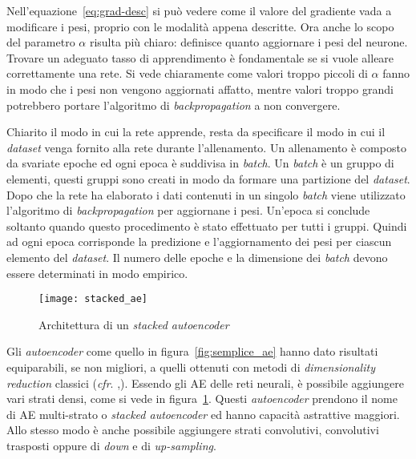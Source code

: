 Nell'equazione~\ref{eq:grad-desc} si può vedere come il valore del gradiente vada a modificare i pesi, proprio con le modalità appena descritte.
Ora anche lo scopo del parametro $\alpha$ risulta più chiaro: definisce quanto aggiornare i pesi del neurone.
Trovare un adeguato tasso di apprendimento è fondamentale se si vuole alleare correttamente una rete.
Si vede chiaramente come valori troppo piccoli di $\alpha$ fanno in modo che i pesi non vengono aggiornati affatto, mentre valori troppo grandi potrebbero portare l'algoritmo di \textit{backpropagation} a non convergere. %

Chiarito il modo in cui la rete apprende, resta da specificare il modo in cui il \textit{dataset} venga fornito alla rete durante l'allenamento.
Un allenamento è composto da svariate epoche ed ogni epoca è suddivisa in \textit{batch}.
Un \textit{batch} è un gruppo di elementi, questi gruppi sono creati in modo da formare una partizione del \textit{dataset}.
Dopo che la rete ha elaborato i dati contenuti in un singolo \textit{batch} viene utilizzato l'algoritmo di \textit{backpropagation} per aggiornane i pesi.
Un'epoca si conclude soltanto quando questo procedimento è stato effettuato per tutti i gruppi.
Quindi ad ogni epoca corrisponde la predizione e l'aggiornamento dei pesi per ciascun elemento del \textit{dataset}.
Il numero delle epoche e la dimensione dei \textit{batch} devono essere determinati in modo empirico. %


\begin{figure}[ht] %
  \begin{center}
    \centering\texttt{[image: stacked\_ae]}
  \end{center}
  \caption{Architettura di un \textit{stacked autoencoder}}
  \label{fig:stacked_ae}
\end{figure}
Gli \textit{autoencoder} come quello in figura~\ref{fig:semplice_ae} hanno dato risultati equiparabili, se non migliori, a quelli ottenuti con metodi di \textit{dimensionality reduction} classici (\textit{cfr}. \cite{ng_sparse_ae},\cite{pca_vs_ae_1}).
Essendo gli AE delle reti neurali, è possibile aggiungere vari strati densi, come si vede in figura~\ref{fig:stacked_ae}.
Questi \textit{autoencoder} prendono il nome di AE multi-strato o \textit{stacked autoencoder} ed hanno capacità astrattive maggiori. %
Allo stesso modo è anche possibile aggiungere strati convolutivi, convolutivi trasposti oppure di \textit{down} e di \textit{up-sampling}.


